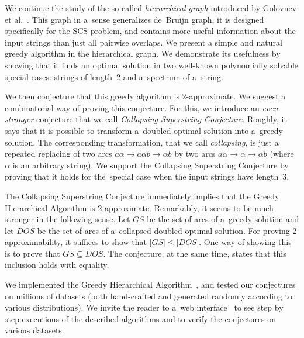 We continue the study of the so-called {\em hierarchical graph}
introduced by Golovnev et al.~\cite{scs_exact}. This graph in a~sense generalizes de~Bruijn graph, it is designed specifically 
for the SCS problem, and contains more useful information about the input strings
than just all pairwise overlaps. We present a simple and natural greedy algorithm
in the hierarchical graph. 
We demonstrate its usefulness by showing that it finds an optimal solution 
in two well-known polynomially solvable special cases: strings of length~$2$ and
a~spectrum of a~string.

We then conjecture that this greedy algorithm is $2$-approximate. We suggest a combinatorial way of proving this conjecture. For this, we introduce an {\em even stronger} conjecture that we call 
{\em Collapsing Superstring Conjecture}. 
Roughly, it says that it is possible to transform a~doubled optimal 
solution into a~greedy solution. 
The corresponding transformation, that we call {\em collapsing}, 
is just a repeated replacing of two arcs $a\alpha \to a\alpha b \to \alpha b$ 
by two arcs $a\alpha \to \alpha \to \alpha b$ (where $\alpha$ is an arbitrary string). 
We support the Collapsing Superstring Conjecture by 
proving that it holds for the~special case when the input strings have length~3.



The Collapsing Superstring Conjecture immediately implies that the Greedy
Hierarchical Algorithm is 2-approximate. Remarkably, it seems to be much
stronger in the following sense. Let $GS$ be the set of arcs of a~greedy
solution and let $DOS$ be the set of arcs of a~collapsed doubled optimal
solution. For proving 2-approximability, it suffices to show that $|GS| \le |DOS|$. 
One way of showing this is to prove that $GS \subseteq DOS$. 
The conjecture, at the same time, states that this inclusion holds with equality.

We implemented the Greedy Hierarchical Algorithm~\cite{github}, and tested our conjectures on millions of datasets (both hand-crafted and generated randomly according to various distributions). 
We invite the reader to a~web interface~\cite{webpage} to see step by step executions of the described algorithms and to verify the conjectures on
various datasets.

